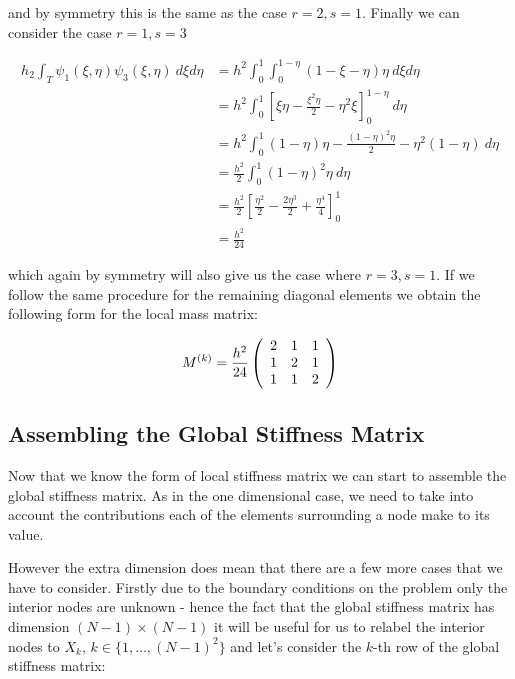 and by symmetry this is the same as the case $r = 2, s = 1$. Finally we can consider the case
$r = 1, s = 3$

\begin{align*}
    h_2\int_T\psi_1(\xi, \eta)\psi_3(\xi, \eta)\ d\xi d\eta
    &= h^2\int_0^1\int_0^{1-\eta}(1 - \xi - \eta)\eta\ d\xi d\eta \\
    &= h^2\int_0^1\left[\xi\eta - \frac{\xi^2\eta}{2} - \eta^2\xi\right]_0^{1-\eta}\ d\eta \\
    &= h^2\int_0^1(1-\eta)\eta - \frac{(1 - \eta)^2\eta}{2} - \eta^2(1 - \eta)\ d\eta \\
    &= \frac{h^2}{2}\int_0^1(1 - \eta)^2\eta \ d\eta \\
    &= \frac{h^2}{2}\left[\frac{\eta^2}{2} - \frac{2\eta^3}{2} + \frac{\eta^4}{4}\right]_0^1 \\
    &= \frac{h^2}{24}
\end{align*}

which again by symmetry will also give us the case where $r = 3, s = 1$. If we
follow the same procedure for the remaining diagonal elements we obtain the
following form for the local mass matrix:

\begin{equation}\label{eq:twod-local-mass}
    M^{(k)} =
    \frac{h^2}{24}\left(\begin{array}{c c c}
         2 &  1 &  1 \\
         1 &  2 &  1 \\
         1 &  1 &  2
      \end{array}\right)
\end{equation}

\subsection{Assembling the Global Stiffness Matrix}

Now that we know the form of local stiffness matrix
 we can start to assemble the global stiffness
matrix. As in the one dimensional case, we need to take into account the
contributions each of the elements surrounding a node make to its value.

However the extra dimension does mean that there are a few more cases that we
have to consider. Firstly due to the boundary conditions on the problem only
the interior nodes are unknown - hence the fact that the global stiffness
matrix has dimension $(N - 1) \times (N - 1)$ it will be useful for us to
relabel the interior nodes to $X_k$, $k \in \{1, \ldots, (N-1)^2\}$ and let's
consider the $k$-th row of the global stiffness matrix:

